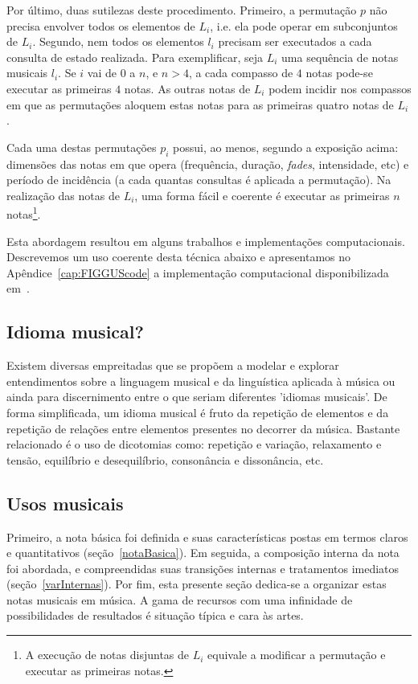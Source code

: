 Por último, duas sutilezas deste procedimento.
Primeiro, a permutação $p$ não precisa envolver todos os elementos de $L_i$, i.e. ela
pode operar em subconjuntos de $L_i$. Segundo, nem todos os elementos $l_i$ precisam ser executados a cada consulta de estado realizada.
Para exemplificar, seja $L_i$ 
uma sequência de notas musicais $l_i$. 
Se $i$ vai de $0$ a $n$, e $n>4$, a cada compasso
de $4$ notas pode-se executar as primeiras $4$ notas. As outras notas de
$L_i$ podem incidir nos compassos em que as permutações aloquem
estas notas para as primeiras quatro notas de $L_i$.

Cada uma destas permutações
$p_i$ possui, ao menos, segundo a exposição acima: dimensões das notas em que opera (frequência, duração, \emph{fades}, intensidade, etc) e período de incidência (a cada quantas consultas é aplicada a permutação). Na realização das notas de $L_i$, uma forma fácil e coerente é executar as primeiras $n$ notas\footnote{A execução de notas disjuntas de $L_i$ equivale a modificar a permutação e executar as primeiras notas.}.

Esta abordagem resultou em alguns trabalhos e implementações computacionais.\cite{repoFIGGUS,repoFIGGUSold,figgusOriginal,figgusEspacializacao} Descrevemos um uso coerente desta técnica abaixo e apresentamos no Apêndice~\ref{cap:FIGGUScode} a implementação computacional disponibilizada em~\cite{repoFIGGUS}.

\subsection{Idioma musical?}

Existem diversas empreitadas que se propõem a modelar e explorar entendimentos
sobre a linguagem musical e da linguística aplicada à música ou ainda
para discernimento entre 
o que seriam diferentes
'idiomas musicais'.\cite{Lerdahl, Harmonia, Schachter,Alfaix}
De forma simplificada, um idioma musical é fruto da
repetição de elementos e da repetição de relações entre elementos presentes no decorrer da música. Bastante relacionado é o uso de dicotomias 
como: repetição e variação, relaxamento e tensão, equilíbrio e desequilíbrio, consonância e dissonância, etc. 

\subsection{Usos musicais}

Primeiro, a nota básica foi definida e suas características postas em termos
claros e quantitativos (seção~\ref{notaBasica}). Em seguida, a composição interna da nota foi abordada, e compreendidas suas transições internas e tratamentos imediatos (seção~\ref{varInternas}). Por fim, esta presente seção dedica-se a organizar estas notas musicais em música.
A gama de recursos com uma infinidade de possibilidades de resultados
é situação típica e cara às artes.\cite{Harmonia,Webern}

